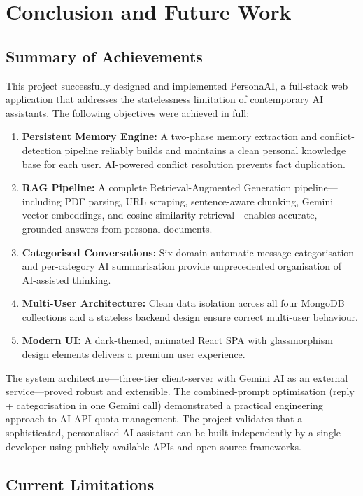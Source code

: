 \documentclass[12pt,a4paper]{report}
\begin{document}
\chapter{Conclusion and Future Work}
\label{chap:conclusion}

\section{Summary of Achievements}

This project successfully designed and implemented PersonaAI, a full-stack web application that addresses the statelessness limitation of contemporary AI assistants. The following objectives were achieved in full:

\begin{enumerate}
  \item \textbf{Persistent Memory Engine:} A two-phase memory extraction and conflict-detection pipeline reliably builds and maintains a clean personal knowledge base for each user. AI-powered conflict resolution prevents fact duplication.
  \item \textbf{RAG Pipeline:} A complete Retrieval-Augmented Generation pipeline—including PDF parsing, URL scraping, sentence-aware chunking, Gemini vector embeddings, and cosine similarity retrieval—enables accurate, grounded answers from personal documents.
  \item \textbf{Categorised Conversations:} Six-domain automatic message categorisation and per-category AI summarisation provide unprecedented organisation of AI-assisted thinking.
  \item \textbf{Multi-User Architecture:} Clean data isolation across all four MongoDB collections and a stateless backend design ensure correct multi-user behaviour.
  \item \textbf{Modern UI:} A dark-themed, animated React SPA with glassmorphism design elements delivers a premium user experience.
\end{enumerate}

The system architecture—three-tier client-server with Gemini AI as an external service—proved robust and extensible. The combined-prompt optimisation (reply + categorisation in one Gemini call) demonstrated a practical engineering approach to AI API quota management. The project validates that a sophisticated, personalised AI assistant can be built independently by a single developer using publicly available APIs and open-source frameworks.

\section{Current Limitations}
\end{document}
